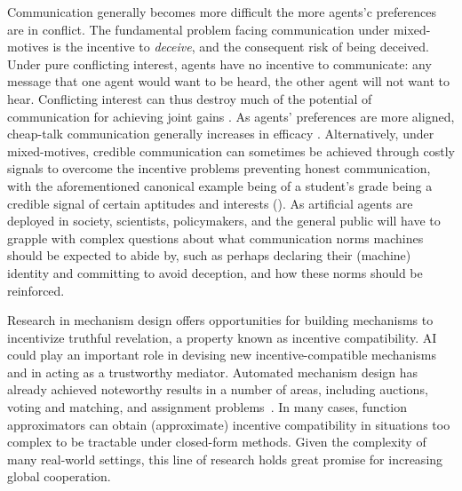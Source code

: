 \documentclass[11pt, a4paper, logo, onecolumn, nonumbering]{deepmind}
\begin{document}
Communication generally becomes more difficult the more agents'c preferences are in conflict. The fundamental problem facing communication under mixed-motives is the incentive to \textit{deceive}, and the consequent risk of being deceived. Under pure conflicting interest, agents have no incentive to communicate: any message that one agent would want to be heard, the other agent will not want to hear. Conflicting interest can thus destroy much of the potential of communication for achieving joint gains
 \cite{camera2011communication}. As agents' preferences are more aligned, cheap-talk communication generally increases in efficacy \cite{Crawford1982Strategic}. Alternatively, under mixed-motives, credible communication can sometimes be achieved through costly signals to overcome the incentive problems preventing honest communication, with the aforementioned canonical example being of a student's grade being a credible signal of certain aptitudes and interests (\cite{spense1973job, zahavi1977reliability, barclay2013strategies}). As artificial agents are deployed in society, scientists, policymakers, and the general public will have to grapple with complex questions about what communication norms machines should be expected to abide by, such as perhaps declaring their (machine) identity \cite{o2019google} and committing to avoid deception, and how these norms should be reinforced. 
 



Research in mechanism design offers opportunities for building mechanisms to incentivize truthful revelation, a property known as incentive compatibility. 
AI could play an important role in devising new incentive-compatible mechanisms and in acting as a trustworthy mediator. Automated mechanism design has already achieved noteworthy results in a number of areas, including auctions, voting and matching, and assignment problems~\cite{Feng2018dl, Cai2012optimal, Cai2012algorithmic, Narisimhan2016Automated}. In many cases, function approximators can obtain (approximate) incentive compatibility in situations too complex to be tractable under closed-form methods. Given the complexity of many real-world settings, this line of research holds great promise for increasing global cooperation. 
\end{document}

